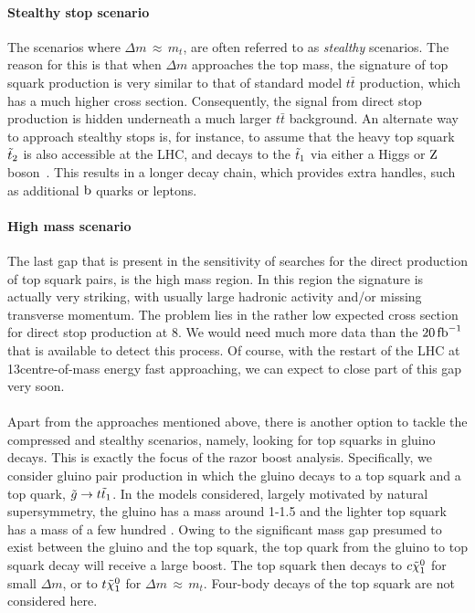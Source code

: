 \paragraph{Stealthy stop scenario}
The scenarios where $\Delta m\,{\approx}\, m_t$, are often referred to as \textit{stealthy}
scenarios. The reason for this is that when $\Delta m$ approaches the top mass, the signature of
top squark production is very similar to that of standard model $t\bar{t}$ production,
which has a much higher cross section. Consequently, the signal from direct stop production is
hidden underneath a much larger $t\bar{t}$ background. An alternate way to approach stealthy stops
is, for instance, to assume that the heavy top squark $\tilde{t}_2$ is also accessible at the LHC, and
decays to the $\tilde{t}_1$ via either a Higgs or $\mathrm{Z}$ boson~\cite{Khachatryan:2014doa}. This
results in a longer decay chain, which provides extra handles, such as additional $\mathrm{b}$ quarks or
leptons. 

\paragraph{High mass scenario}
The last gap that is present in the sensitivity of searches for the direct production of top squark
pairs, is the high mass region. In this region the signature is actually very striking, with
usually large hadronic activity and/or missing transverse momentum. The problem lies in the rather
low expected cross section for direct stop production at 8\TeV. We would need much more data than
the $20\mbox{\ensuremath{\,\text{fb}^\text{$-$1}}}$ that is available to detect this process. 
Of course, with the restart of the LHC at 13\TeV centre-of-mass energy fast approaching, we can
expect to close part of this gap very soon.

\paragraph{}
Apart from the approaches mentioned above, there is another option to tackle the compressed and
stealthy scenarios, namely, looking for top squarks in gluino decays. This is exactly the focus of
the razor boost analysis. 
Specifically, we consider gluino pair production in which the gluino decays to a top squark and a
top quark, $\tilde{g} \rightarrow t \tilde{t}_1$. In the models considered, largely motivated by
natural supersymmetry, the gluino has a mass around 1-1.5 \TeV and the lighter top squark has a mass
of a few hundred \GeV. Owing to the significant mass gap presumed to exist between the gluino and
the top squark, the top quark from the gluino to top squark decay will receive a large boost.  
The top squark then decays to $c \tilde{\chi}_1^0$ for small $\Delta m$, or to $t \tilde{\chi}_1^0$ for $\Delta m
\,{\approx}\, m_t$. Four-body decays of the top squark are not considered here. 

